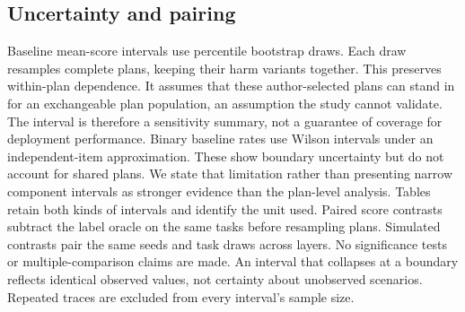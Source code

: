 \documentclass{article}
\begin{document}
\subsection{Uncertainty and pairing}
Baseline mean-score intervals use \drawCount{} percentile bootstrap draws. Each draw resamples complete plans, keeping their harm variants together. This preserves within-plan dependence. It assumes that these author-selected plans can stand in for an exchangeable plan population, an assumption the study cannot validate. The interval is therefore a sensitivity summary, not a guarantee of coverage for deployment performance.
Binary baseline rates use Wilson intervals under an independent-item approximation. These show boundary uncertainty but do not account for shared plans. We state that limitation rather than presenting narrow component intervals as stronger evidence than the plan-level analysis. Tables retain both kinds of intervals and identify the unit used.
Paired score contrasts subtract the label oracle on the same tasks before resampling plans. Simulated contrasts pair the same seeds and task draws across layers. No significance tests or multiple-comparison claims are made. An interval that collapses at a boundary reflects identical observed values, not certainty about unobserved scenarios. Repeated traces are excluded from every interval's sample size.
\end{document}
